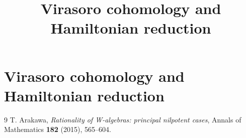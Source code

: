 \documentclass[11pt,oneside]{memoir}
\title{Virasoro cohomology and Hamiltonian reduction}
\author{}
\date{}
\begin{document}
\chapter{Virasoro cohomology and Hamiltonian reduction}




\begin{thebibliography}{9}
 T. Arakawa, \emph{Rationality of W-algebras: principal nilpotent cases}, Annals of Mathematics \textbf{182} (2015), 565--604.
\end{thebibliography}
\end{document}
